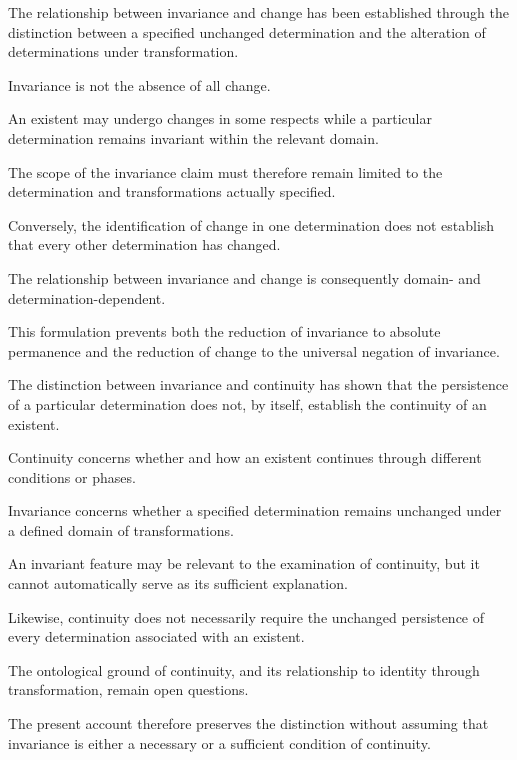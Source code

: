 
The relationship between invariance
and change has been established through
the distinction between a specified
unchanged determination and the
alteration of determinations under
transformation.

Invariance is not the absence of all change.

An existent may undergo changes in
some respects while a particular
determination remains invariant
within the relevant domain.

The scope of the invariance claim
must therefore remain limited to
the determination and transformations
actually specified.

Conversely, the identification of
change in one determination does
not establish that every other
determination has changed.

The relationship between invariance
and change is consequently domain-
and determination-dependent.

This formulation prevents both
the reduction of invariance to
absolute permanence and the
reduction of change to the universal
negation of invariance.


The distinction between invariance
and continuity has shown that
the persistence of a particular
determination does not, by itself,
establish the continuity of an
existent.

Continuity concerns whether and
how an existent continues through
different conditions or phases.

Invariance concerns whether a
specified determination remains
unchanged under a defined domain
of transformations.

An invariant feature may be relevant
to the examination of continuity,
but it cannot automatically serve
as its sufficient explanation.

Likewise, continuity does not
necessarily require the unchanged
persistence of every determination
associated with an existent.

The ontological ground of continuity,
and its relationship to identity
through transformation, remain
open questions.

The present account therefore
preserves the distinction without
assuming that invariance is either
a necessary or a sufficient condition
of continuity.

